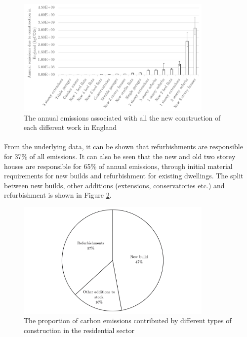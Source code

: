 \documentclass[12pt]{article}
\begin{document}
\begin{figure}[!ht]
    \centering
    \includegraphics[width=0.85\textwidth]{Figures/Works_eng.png}
    \caption{The annual emissions associated with all the new construction of each different work in England}
    \label{fig:emissionsbywork}
\end{figure}

\paragraph{}
From the underlying data, it can be shown that refurbishments are responsible for 37\% of all emissions. It can also be seen that the new and old two storey houses are responsible for 65\% of annual emissions, through initial material requirements for new builds and refurbishment for existing dwellings. The split between new builds, other additions (extensions, conservatories etc.) and refurbishment is shown in Figure \ref{fig:propssumm}.

\begin{figure}[!ht]
    \centering
    \includegraphics[width=0.85\textwidth]{Figures/Props_summ.png}
    \caption{The proportion of carbon emissions contributed by different types of construction in the residential sector}
    \label{fig:propssumm}
\end{figure}
\end{document}
